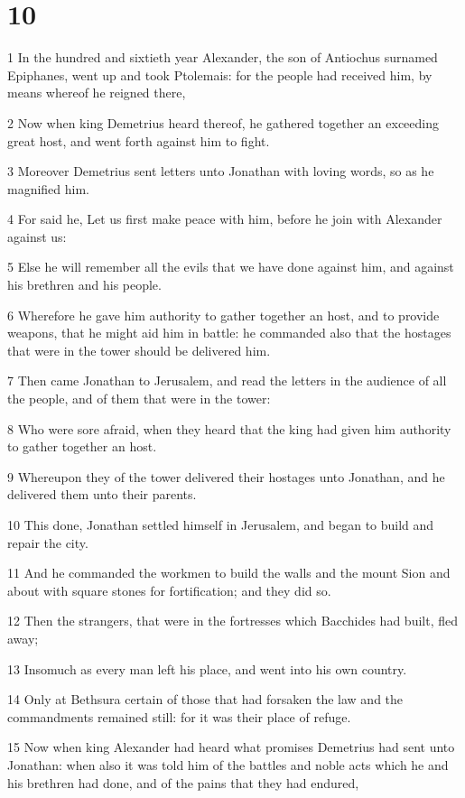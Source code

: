 \chapter{10}

\par 1 In the hundred and sixtieth year Alexander, the son of Antiochus surnamed Epiphanes, went up and took Ptolemais: for the people had received him, by means whereof he reigned there,
\par 2 Now when king Demetrius heard thereof, he gathered together an exceeding great host, and went forth against him to fight.
\par 3 Moreover Demetrius sent letters unto Jonathan with loving words, so as he magnified him.
\par 4 For said he, Let us first make peace with him, before he join with Alexander against us:
\par 5 Else he will remember all the evils that we have done against him, and against his brethren and his people.
\par 6 Wherefore he gave him authority to gather together an host, and to provide weapons, that he might aid him in battle: he commanded also that the hostages that were in the tower should be delivered him.
\par 7 Then came Jonathan to Jerusalem, and read the letters in the audience of all the people, and of them that were in the tower:
\par 8 Who were sore afraid, when they heard that the king had given him authority to gather together an host.
\par 9 Whereupon they of the tower delivered their hostages unto Jonathan, and he delivered them unto their parents.
\par 10 This done, Jonathan settled himself in Jerusalem, and began to build and repair the city.
\par 11 And he commanded the workmen to build the walls and the mount Sion and about with square stones for fortification; and they did so.
\par 12 Then the strangers, that were in the fortresses which Bacchides had built, fled away;
\par 13 Insomuch as every man left his place, and went into his own country.
\par 14 Only at Bethsura certain of those that had forsaken the law and the commandments remained still: for it was their place of refuge.
\par 15 Now when king Alexander had heard what promises Demetrius had sent unto Jonathan: when also it was told him of the battles and noble acts which he and his brethren had done, and of the pains that they had endured,
